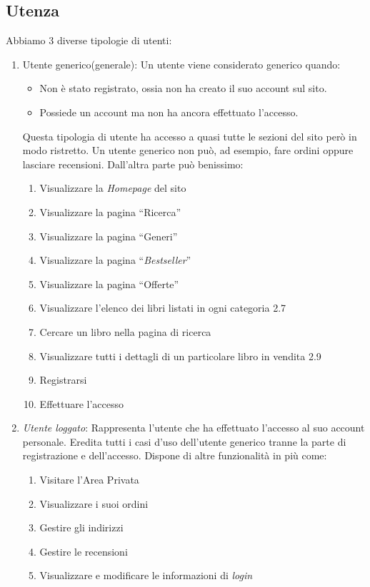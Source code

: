 \subsection{Utenza}
Abbiamo 3 diverse tipologie di utenti:
\begin{enumerate}
	\item Utente generico(generale): Un utente viene considerato generico quando:
	\begin{itemize}
		\item Non è stato registrato, ossia non ha creato il suo account sul sito.
		\item Possiede un account ma non ha ancora effettuato l’accesso.
	\end{itemize}
Questa tipologia di utente ha accesso a quasi tutte le sezioni del sito però in modo ristretto. Un utente generico non può, ad esempio, fare ordini oppure lasciare recensioni. Dall’altra parte può benissimo:
	\begin{enumerate}[label*=\arabic*.]
		\item Visualizzare la \textit{Homepage} del sito
	 	\item Visualizzare la pagina “Ricerca”
		\item Visualizzare la pagina “Generi”
		\item Visualizzare la pagina “\textit{Bestseller}”
		\item Visualizzare la pagina “Offerte”
		\item Visualizzare l’elenco dei libri listati in ogni categoria 2.7 
		\item Cercare un libro nella pagina di ricerca
		\item Visualizzare tutti i dettagli di un particolare libro in vendita 2.9
		\item Registrarsi
		\item Effettuare l’accesso
	\end{enumerate}
	\item \textit{Utente loggato}: Rappresenta l’utente che ha effettuato l’accesso al suo account personale. Eredita tutti i casi d’uso dell’utente generico tranne la parte di registrazione e dell’accesso. Dispone di altre funzionalità in più come:
	\begin{enumerate}[label*=\arabic*.]
		\item Visitare l'Area Privata
		\item Visualizzare i suoi ordini
		\item Gestire gli indirizzi
		\item Gestire le recensioni
		\item Visualizzare e modificare le informazioni di \textit{login}

\end{enumerate}
\end{enumerate}
